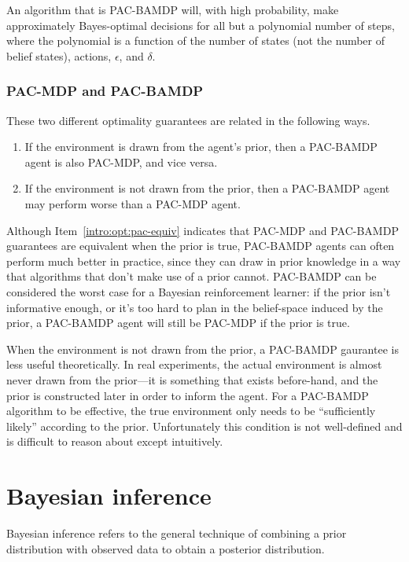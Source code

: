 An algorithm that is PAC-BAMDP will, with high probability, make approximately Bayes-optimal decisions for all but a polynomial number of steps, where the polynomial is a function of the number of states (not the number of belief states), actions, $\epsilon$, and $\delta$.

\subsubsection{PAC-MDP and PAC-BAMDP} These two different optimality guarantees are related in the following ways.

\begin{enumerate}
\item If the environment is drawn from the agent's prior, then a PAC-BAMDP agent is also PAC-MDP, and vice versa. \label{intro:opt:pac-equiv}
\item If the environment is not drawn from the prior, then a PAC-BAMDP agent may perform worse than a PAC-MDP agent.
\end{enumerate}

Although Item~\ref{intro:opt:pac-equiv} indicates that PAC-MDP and PAC-BAMDP guarantees are equivalent when the prior is true, PAC-BAMDP agents can often perform much better in practice, since they can draw in prior knowledge in a way that algorithms that don't make use of a prior cannot. PAC-BAMDP can be considered the worst case for a Bayesian reinforcement learner: if the prior isn't informative enough, or it's too hard to plan in the belief-space induced by the prior, a PAC-BAMDP agent will still be PAC-MDP if the prior is true.

When the environment is not drawn from the prior, a PAC-BAMDP gaurantee is less useful theoretically. In real experiments, the actual environment is almost never drawn from the prior---it is something that exists before-hand, and the prior is constructed later in order to inform the agent. For a PAC-BAMDP algorithm to be effective, the true environment only needs to be ``sufficiently likely'' according to the prior. Unfortunately this condition is not well-defined and is difficult to reason about except intuitively. 

\section{Bayesian inference}

Bayesian inference refers to the general technique of combining a prior distribution with observed data to obtain a posterior distribution.

